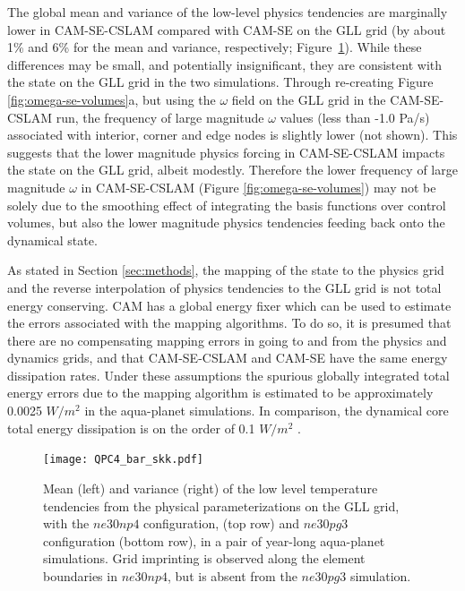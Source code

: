 \documentclass{ametsoc}
\begin{document}
The global mean and variance of the low-level physics tendencies are marginally lower in CAM-SE-CSLAM compared with CAM-SE on the GLL grid (by about 1\% and 6\% for the mean and variance, respectively; Figure~\ref{fig:tendency_imprint}). While these differences may be small, and potentially insignificant, they are consistent with the state on the GLL grid in the two simulations. Through re-creating Figure \ref{fig:omega-se-volumes}a, but using the $\omega$ field on the GLL grid in the CAM-SE-CSLAM run, the frequency of large magnitude $\omega$ values (less than -1.0 Pa/s) associated with interior, corner and edge nodes is slightly lower (not shown). This suggests that the lower magnitude physics forcing in CAM-SE-CSLAM impacts the state on the GLL grid, albeit modestly. Therefore the lower frequency of large magnitude $\omega$ in CAM-SE-CSLAM (Figure \ref{fig:omega-se-volumes}) may not be solely due to the smoothing effect of integrating the basis functions over control volumes, but also the lower magnitude physics tendencies feeding back onto the dynamical state.

As stated in Section \ref{sec:methods}, the mapping of the state to the physics grid and the reverse interpolation of physics tendencies to the GLL grid is not total energy conserving. CAM has a global energy fixer \citep{WOHTTV2015JAMES} which can be used to estimate the errors associated with the mapping algorithms. To do so, it is presumed that there are no compensating mapping errors in going to and from the physics and dynamics grids, and that CAM-SE-CSLAM and CAM-SE have the same energy dissipation rates. Under these assumptions the spurious globally integrated total energy errors due to the mapping algorithm is estimated to be approximately 0.0025 $W/m^2$ in the aqua-planet simulations. In comparison, the dynamical core total energy dissipation is on the order of 0.1 $W/m^2$ \citep{LetAl2018JAMES}. 

\begin{figure}[t]
\noindent\texttt{[image: QPC4\_bar\_skk.pdf]}\\
\caption{Mean (left) and variance (right) of the low level temperature tendencies from the physical parameterizations on the GLL grid, with the $ne30np4$ configuration, (top row) and $ne30pg3$ configuration (bottom row), in a pair of year-long aqua-planet simulations. Grid imprinting is observed along the element boundaries in $ne30np4$, but is absent from the $ne30pg3$ simulation.}
\label{fig:tendency_imprint}
\end{figure}
\end{document}
